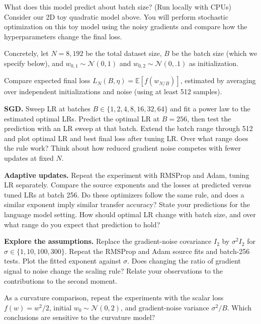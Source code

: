 \begin{problem}{What does this model predict about batch size? (Run locally with CPUs)}
  Consider our 2D toy quadratic model above. You will perform stochastic optimization on this toy model using the noisy gradients and compare how the hyperparameters change the final loss.

    Concretely, let $N=8,192$ be the total dataset size, $B$ be the batch size (which we specify below), and  $w_{0,1}\sim\mathcal N(0,1)$ and $w_{0,2}\sim\mathcal N(0,.1)$ as initialization.

     Compare expected final loss $L_N(B,\eta)=\mathbb E[f(w_{N/B})]$, estimated by averaging over independent
     initializations and noise (using at least 512 samples).

  \begin{parts}


\item \textbf{SGD.}
Sweep LR at batches $B\in\{1,2,4,8,16,32,64\}$ and fit a power law to the
estimated optimal LRs. Predict the optimal LR at $B=256$, then test the
prediction with an LR sweep at that batch. Extend the batch range through
512 and plot optimal LR and best final loss after tuning LR.
Over what range does the rule work? Think about how reduced gradient noise
competes with fewer updates at fixed $N$.

\item \textbf{Adaptive updates.}
Repeat the experiment with RMSProp and Adam, tuning LR separately.
Compare the source exponents and the losses at predicted versus tuned LRs
at batch 256. Do these optimizers follow the same rule, and does a similar exponent imply similar transfer accuracy?
State your predictions for the language model setting. How should optimal LR change with batch size, and over what range do you expect that prediction to hold?

\item \textbf{Explore the assumptions.}
Replace the gradient-noise covariance $I_2$ by $\sigma^2 I_2$ for
$\sigma\in\{1,\allowbreak 10,\allowbreak 100,\allowbreak 300\}$. Repeat the RMSProp and Adam source fits and
batch-256 tests. Plot the fitted exponent against $\sigma$.
Does changing the ratio of gradient signal to noise change the scaling rule?
Relate your observations to the contributions to the second moment.

As a curvature comparison, repeat the experiments with the scalar loss $f(w)=w^2/2$, initial $w_0\sim\mathcal N(0,2)$, and gradient-noise variance $\sigma^2/B$. Which conclusions
are sensitive to the curvature model?


\end{parts}
\end{problem}
